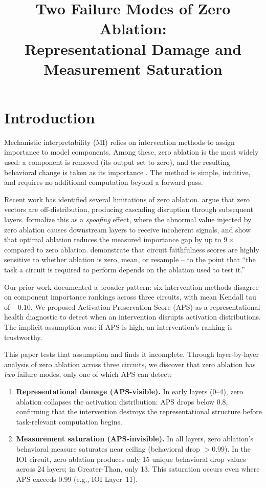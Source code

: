 \documentclass[pdflatex,sn-mathphys-num]{sn-jnl}
\title[Two Failure Modes of Zero Ablation]{Two Failure Modes of Zero Ablation:\\Representational Damage and Measurement Saturation}
\author*[1]{\fnm{Dong} \sur{Liu}}\email{liudong@lynu.edu.cn}
\author[2]{\fnm{Caihuan} \sur{Zhang}}
\affil*[1]{\orgdiv{School of Software}, \orgname{Luoyang Normal University}, \orgaddress{\city{Luoyang}, \state{Henan}, \postcode{471934}, \country{China}}}
\affil[2]{\orgdiv{School of Mathematics}, \orgname{Luoyang Normal University}, \orgaddress{\city{Luoyang}, \state{Henan}, \postcode{471934}, \country{China}}}
\begin{document}
\maketitle

\section{Introduction}

Mechanistic interpretability (MI) relies on intervention methods to assign importance to model components. Among these, zero ablation is the most widely used: a component is removed (its output set to zero), and the resulting behavioral change is taken as its importance \citep{Wang2022,Meng2022,Conmy2023}. The method is simple, intuitive, and requires no additional computation beyond a forward pass.

Recent work has identified several limitations of zero ablation. \citet{Chan2022} argue that zero vectors are off-distribution, producing cascading disruption through subsequent layers. \citet{LiJanson2024} formalize this as a \emph{spoofing} effect, where the abnormal value injected by zero ablation causes downstream layers to receive incoherent signals, and show that optimal ablation reduces the measured importance gap by up to $9\times$ compared to zero ablation. \citet{Miller2024} demonstrate that circuit faithfulness scores are highly sensitive to whether ablation is zero, mean, or resample -- to the point that ``the task a circuit is required to perform depends on the ablation used to test it.''

Our prior work \citep{Liu2025} documented a broader pattern: six intervention methods disagree on component importance rankings across three circuits, with mean Kendall tau of $-0.10$. We proposed Activation Preservation Score (APS) as a representational health diagnostic to detect when an intervention disrupts activation distributions. The implicit assumption was: if APS is high, an intervention's ranking is trustworthy.

This paper tests that assumption and finds it incomplete. Through layer-by-layer analysis of zero ablation across three circuits, we discover that zero ablation has \emph{two} failure modes, only one of which APS can detect:

\begin{enumerate}
    \item \textbf{Representational damage (APS-visible).} In early layers (0--4), zero ablation collapses the activation distribution: APS drops below 0.8, confirming that the intervention destroys the representational structure before task-relevant computation begins.
    \item \textbf{Measurement saturation (APS-invisible).} In all layers, zero ablation's behavioral measure saturates near ceiling (behavioral drop $> 0.99$). In the IOI circuit, zero ablation produces only 15 unique behavioral drop values across 24 layers; in Greater-Than, only 13. This saturation occurs even where APS exceeds 0.99 (e.g., IOI Layer~11).
\end{enumerate}
\end{document}

